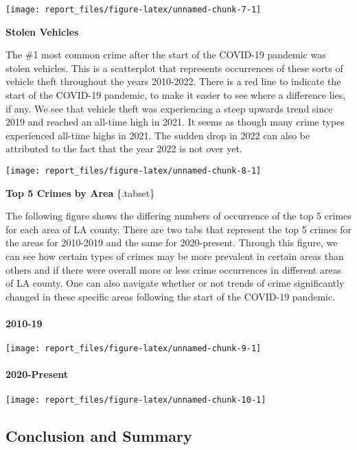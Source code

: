 \documentclass[
]{article}
\begin{document}
\begin{center}\texttt{[image: report\_files/figure-latex/unnamed-chunk-7-1]} \end{center}

\textbf{Stolen Vehicles}

The \#1 most common crime after the start of the COVID-19 pandemic was
stolen vehicles. This is a scatterplot that represents occurrences of
these sorts of vehicle theft throughout the years 2010-2022. There is a
red line to indicate the start of the COVID-19 pandemic, to make it
easier to see where a difference lies, if any. We see that vehicle theft
was experiencing a steep upwards trend since 2019 and reached an
all-time high in 2021. It seems as though many crime types experienced
all-time highs in 2021. The sudden drop in 2022 can also be attributed
to the fact that the year 2022 is not over yet.

\begin{center}\texttt{[image: report\_files/figure-latex/unnamed-chunk-8-1]} \end{center}

\textbf{Top 5 Crimes by Area} \{.tabset\}

The following figure shows the differing numbers of occurrence of the
top 5 crimes for each area of LA county. There are two tabs that
represent the top 5 crimes for the areas for 2010-2019 and the same for
2020-present. Through this figure, we can see how certain types of
crimes may be more prevalent in certain areas than others and if there
were overall more or less crime occurrences in different areas of LA
county. One can also navigate whether or not trends of crime
significantly changed in these specific areas following the start of the
COVID-19 pandemic.

\hypertarget{section}{%
\paragraph{2010-19}\label{section}}

\begin{center}\texttt{[image: report\_files/figure-latex/unnamed-chunk-9-1]} \end{center}

\hypertarget{present}{%
\paragraph{2020-Present}\label{present}}

\begin{center}\texttt{[image: report\_files/figure-latex/unnamed-chunk-10-1]} \end{center}

\hypertarget{section-1}{%
\subsubsection*{}\label{section-1}}

\hypertarget{conclusion-and-summary}{%
\subsection{Conclusion and Summary}\label{conclusion-and-summary}}
\end{document}
